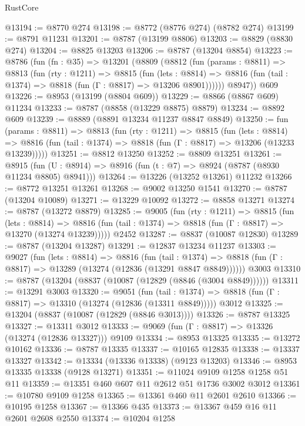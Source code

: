 \begin{lexlean}{RustCore}
\begin{coremodule}
@13194 := @8770 @274
@13198 := @8772 (@8776 @274) (@8782 @274)
@13199 := @8791 @11231
@13201 := @8787 (@13199 @8806)
@13203 := @8829 (@8830 @274)
@13204 := @8825 @13203
@13206 := @8787 (@13204 @8854)
@13223 := @8786
    (fun (fn : @35) =>
    @13201
      (@8809
        (@8812
          (fun (params : @8811) =>
          @8813
            (fun (rty : @1211) =>
            @8815
              (fun (lets : @8814) =>
              @8816 (fun (tail : @1374) => @8818 (fun (Γ : @8817) => @13206 @8901))))))
        @8947))
    @609
@13226 := @8953 (@13199 (@8804 @609))
@13229 := @8866 (@8867 @609) @11234
@13233 := @8787 (@8858 (@13229 @8875) @8879)
@13234 := @8892 @609
@13239 := @8889 (@8891 @13234 @11237 @8847 @8849)
@13250 := fun (params : @8811) =>
  @8813
    (fun (rty : @1211) =>
    @8815
      (fun (lets : @8814) =>
      @8816 (fun (tail : @1374) => @8818 (fun (Γ : @8817) => @13206 (@13233 @13239)))))
@13251 := @8812 @13250
@13252 := @8809 @13251
@13261 := @8915
    (fun (U : @8914) => @8916 (fun (t : @7) => @8924 (@8787 (@8930 @11234 @8805) @8941)))
@13264 := @13226 (@13252 @13261) @11232
@13266 := @8772 @13251 @13261
@13268 := @9002 @13250 @1541
@13270 := @8787 (@13204 @10089)
@13271 := @13229 @10092
@13272 := @8858 @13271
@13274 := @8787 (@13272 @8879)
@13285 := @9005
    (fun (rty : @1211) =>
    @8815
      (fun (lets : @8814) =>
      @8816 (fun (tail : @1374) => @8818 (fun (Γ : @8817) => @13270 (@13274 @13239)))))
    @2452
@13287 := @8837 (@10087 @12830)
@13289 := @8787 (@13204 @13287)
@13291 := @12837 @13234 @11237
@13303 := @9027
    (fun (lets : @8814) =>
    @8816
      (fun (tail : @1374) =>
      @8818 (fun (Γ : @8817) => @13289 (@13274 (@12836 (@13291 @8847 @8849))))))
    @3003
@13310 := @8787 (@13204 (@8837 (@10087 (@12829 (@8846 (@3004 @8849))))))
@13311 := @13291 @3003
@13320 := @9051
    (fun (tail : @1374) => @8818 (fun (Γ : @8817) => @13310 (@13274 (@12836 (@13311 @8849)))))
    @3012
@13325 := @13204 (@8837 (@10087 (@12829 (@8846 @3013))))
@13326 := @8787 @13325
@13327 := @13311 @3012
@13333 := @9069 (fun (Γ : @8817) => @13326 (@13274 (@12836 @13327))) @9109
@13334 := @8953 @13325
@13335 := @13272 @10162
@13336 := @8787 @13335
@13337 := @10165 @12835
@13338 := @13337 @13327
@13342 := @13334 (@13336 @13338) (@9123 @13203)
@13346 := @8953 @13335 @13338 (@9128 @13271)
@13351 := @11024 @9109 @1258 @1258 @51 @11
@13359 := @13351 @460 @607 @11 @2612 @51 @1736 @3002 @3012
@13361 := @10780 @9109 @1258
@13365 := @13361 @460 @11 @2601 @2610
@13366 := @10195 @1258
@13367 := @13366 @435
@13373 := @13367 @459 @16 @11 @2601 @2608 @2550
@13374 := @10204 @1258

\end{coremodule}
\end{lexlean}
